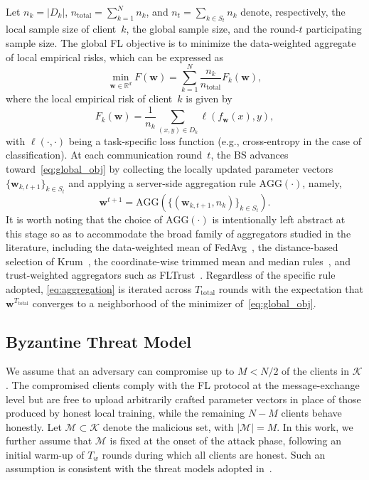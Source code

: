 \documentclass[journal]{IEEEtran}
\begin{document}
Let $n_k = |D_k|$, $n_{\text{total}} = \sum_{k=1}^{N} n_k$, and $n_t = \sum_{k \in S_t} n_k$ denote, respectively, the local sample size of client~$k$, the global sample size, and the round-$t$ participating sample size. The global FL objective is to minimize the data-weighted aggregate of local empirical risks, which can be expressed as
\begin{equation}
\min_{\mathbf{w} \in \mathbb{R}^d} F(\mathbf{w}) = \sum_{k=1}^{N} \frac{n_k}{n_{\text{total}}} F_k(\mathbf{w}),
\label{eq:global_obj}
\end{equation}
where the local empirical risk of client~$k$ is given by
\begin{equation}
F_k(\mathbf{w}) = \frac{1}{n_k} \sum_{(x,y) \in D_k} \ell(f_{\mathbf{w}}(x), y),
\label{eq:local_risk}
\end{equation}
with $\ell(\cdot, \cdot)$ being a task-specific loss function (e.g., cross-entropy in the case of classification). At each communication round~$t$, the BS advances toward~\eqref{eq:global_obj} by collecting the locally updated parameter vectors $\{\mathbf{w}_{k,t+1}\}_{k \in S_t}$ and applying a server-side aggregation rule $\text{AGG}(\cdot)$, namely,
\begin{equation}
\mathbf{w}^{t+1} = \text{AGG}\left(\{(\mathbf{w}_{k,t+1}, n_k)\}_{k \in S_t}\right).
\label{eq:aggregation}
\end{equation}
It is worth noting that the choice of $\text{AGG}(\cdot)$ is intentionally left abstract at this stage so as to accommodate the broad family of aggregators studied in the literature, including the data-weighted mean of FedAvg~\cite{mcmahan2017communication}, the distance-based selection of Krum~\cite{blanchard2017machine}, the coordinate-wise trimmed mean and median rules~\cite{yin2018byzantine}, and trust-weighted aggregators such as FLTrust~\cite{cao2020fltrust}. Regardless of the specific rule adopted, \eqref{eq:aggregation} is iterated across $T_{\text{total}}$ rounds with the expectation that $\mathbf{w}^{T_{\text{total}}}$ converges to a neighborhood of the minimizer of~\eqref{eq:global_obj}.

\subsection{Byzantine Threat Model}

We assume that an adversary can compromise up to $M < N/2$ of the clients in $\mathcal{K}$. The compromised clients comply with the FL protocol at the message-exchange level but are free to upload arbitrarily crafted parameter vectors in place of those produced by honest local training, while the remaining $N - M$ clients behave honestly. Let $\mathcal{M} \subset \mathcal{K}$ denote the malicious set, with $|\mathcal{M}| = M$. In this work, we further assume that $\mathcal{M}$ is fixed at the onset of the attack phase, following an initial warm-up of $T_w$ rounds during which all clients are honest. Such an assumption is consistent with the threat models adopted in~\cite{baruch2019little, shejwalkar2021manipulating}.
\end{document}
